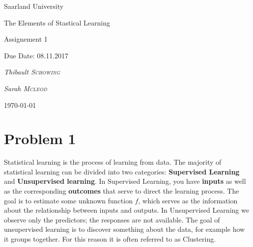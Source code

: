 \documentclass[11pt,a4paper,twoside,openright]{report}
\author{Thibault Schowing and Sarah Mcleod}
\newcommand\blankpage{%
	\null
	\thispagestyle{empty}%
	\addtocounter{page}{-1}%
	\newpage}
\begin{document}
	
	\pagestyle{plain}%

	
	
	\begin{titlepage}
		\centering
		
		\small{Saarland University  \par}
		\huge{The Elements of Stastical Learning\par}
		\vspace{1cm}
		
		
		
		\vspace{1cm}
		\Large{Assignement 1\par}
		\vspace{1.5cm}
		\small{Due Date: 08.11.2017  \par}
		\vspace{1cm}
		
		
		
		\vspace{2cm}
		\small\textit{Thibault \textsc{Schowing}}\par
		\small\textit{Sarah \textsc{Mcleod}}\par
		
		\small{\today\par}
		
		\vfill
		
		
	\end{titlepage}
	\restoregeometry 
	
	
	
	\section*{Problem 1}
	
	Statistical learning is the process of learning from data. The majority of statistical learning can be divided into two categories: \textbf{Supervised Learning} and \textbf{Unsupervised learning}. In Supervised Learning, you have \textbf{inputs} as well as the corresponding \textbf{outcomes} that serve to direct the learning process. The goal is to estimate some unknown function $f$, which serves as the information about the relationship between inputs and outputs. In Unsupervised Learning we observe only the predictors; the responses are not available. The goal of unsupervised learning is to discover something about the data, for example how it groups together. For this reason it is often referred to as Clustering. \\
	
\end{document}
